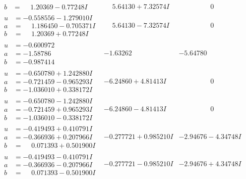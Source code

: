 \documentclass[1p]{elsarticle_modified}
\theoremstyle{definition}
\begin{document}
$$\begin{array}{c|c|c}
\begin{aligned}
b &= \phantom{-}1.20369 - 0.77248 I\end{aligned}
 & \phantom{-}5.64130 + 7.32574 I & \phantom{-0.000000 } 0 \\ \hline\begin{aligned}
u &= -0.558556 - 1.279010 I \\
a &= \phantom{-}1.186450 - 0.705371 I \\
b &= \phantom{-}1.20369 + 0.77248 I\end{aligned}
 & \phantom{-}5.64130 - 7.32574 I & \phantom{-0.000000 } 0 \\ \hline\begin{aligned}
u &= -0.600972\phantom{ +0.000000I} \\
a &= -1.58786\phantom{ +0.000000I} \\
b &= -0.987414\phantom{ +0.000000I}\end{aligned}
 & -1.63262\phantom{ +0.000000I} & -5.64780\phantom{ +0.000000I} \\ \hline\begin{aligned}
u &= -0.650780 + 1.242880 I \\
a &= -0.721459 - 0.965293 I \\
b &= -1.036010 + 0.338172 I\end{aligned}
 & -6.24860 + 4.81413 I & \phantom{-0.000000 } 0 \\ \hline\begin{aligned}
u &= -0.650780 - 1.242880 I \\
a &= -0.721459 + 0.965293 I \\
b &= -1.036010 - 0.338172 I\end{aligned}
 & -6.24860 - 4.81413 I & \phantom{-0.000000 } 0 \\ \hline\begin{aligned}
u &= -0.419493 + 0.410791 I \\
a &= -0.366936 + 0.207966 I \\
b &= \phantom{-}0.071393 + 0.501900 I\end{aligned}
 & -0.277721 + 0.985210 I & -2.94676 - 4.34748 I \\ \hline\begin{aligned}
u &= -0.419493 - 0.410791 I \\
a &= -0.366936 - 0.207966 I \\
b &= \phantom{-}0.071393 - 0.501900 I\end{aligned}
 & -0.277721 - 0.985210 I & -2.94676 + 4.34748 I \\ \hline\begin{aligned}

\end{aligned}
\end{array}$$
\end{document}

